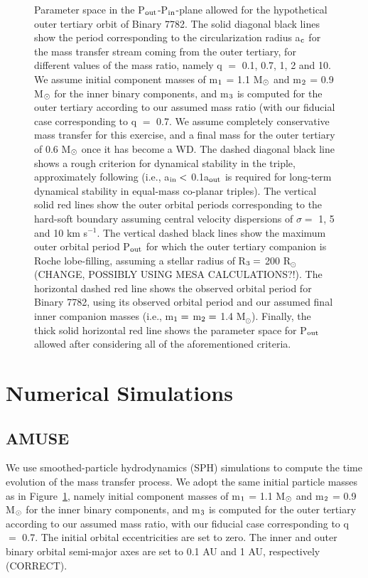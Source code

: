 \documentclass{aastex62}
\begin{document}
\begin{figure}[ht!]
\caption{Parameter space in the P$_{\rm out}$-P$_{\rm in}$-plane allowed for the hypothetical outer tertiary orbit of Binary 7782.  The solid diagonal black lines show the period corresponding to the circularization radius a$_{\rm c}$ for the mass transfer stream coming from the outer tertiary, for different values of the mass ratio, namely q $=$ 0.1, 0.7, 1, 2 and 10.  We assume initial component masses of m$_{\rm 1}$ = 1.1 M$_{\rm \odot}$ and m$_{\rm 2}$ = 0.9 M$_{\rm \odot}$ for the inner binary components, and m$_{\rm 3}$ is computed for the outer tertiary according to our assumed mass ratio (with our fiducial case corresponding to q $=$ 0.7.  We assume completely conservative mass transfer for this exercise, and a final mass for the outer tertiary of 0.6 M$_{\rm \odot}$ once it has become a WD.  The dashed diagonal black line shows a rough criterion for dynamical stability in the triple, approximately following \citet{mardling99} (i.e., a$_{\rm in} <$ 0.1a$_{\rm out}$ is required for long-term dynamical stability in equal-mass co-planar triples).  The vertical solid red lines show the outer orbital periods corresponding to the hard-soft boundary assuming central velocity dispersions of $\sigma =$ 1, 5 and 10 km s$^{-1}$.  The vertical dashed black lines show the maximum outer orbital period P$_{\rm out}$ for which the outer tertiary companion is Roche lobe-filling, assuming a stellar radius of R$_{\rm 3} =$ 200 R$_{\odot}$ (CHANGE, POSSIBLY USING MESA CALCULATIONS?!).  The horizontal dashed red line shows the observed orbital period for Binary 7782, using its observed orbital period and our assumed final inner companion masses (i.e., m$_{\rm 1} =$ m$_{\rm 2} =$ 1.4 M$_{\odot}$).  Finally, the thick solid horizontal red line shows the parameter space for P$_{\rm out}$ allowed after considering all of the aforementioned criteria.
\label{fig:fig2}}
\end{figure}

\section{Numerical Simulations} \label{sims}

\subsection{AMUSE} \label{amuse}

We use smoothed-particle hydrodynamics (SPH) simulations to compute the time evolution of the mass transfer process.  We adopt the same initial particle masses as in Figure~\ref{fig:fig2}, namely initial component masses of m$_{\rm 1}$ = 1.1 M$_{\rm \odot}$ and m$_{\rm 2}$ = 0.9 M$_{\rm \odot}$ for the inner binary components, and m$_{\rm 3}$ is computed for the outer tertiary according to our assumed mass ratio, with our fiducial case corresponding to q $=$ 0.7.  The initial orbital eccentricities are set to zero.  The inner and outer binary orbital semi-major axes are set to 0.1 AU and 1 AU, respectively (CORRECT).  
\end{document}
